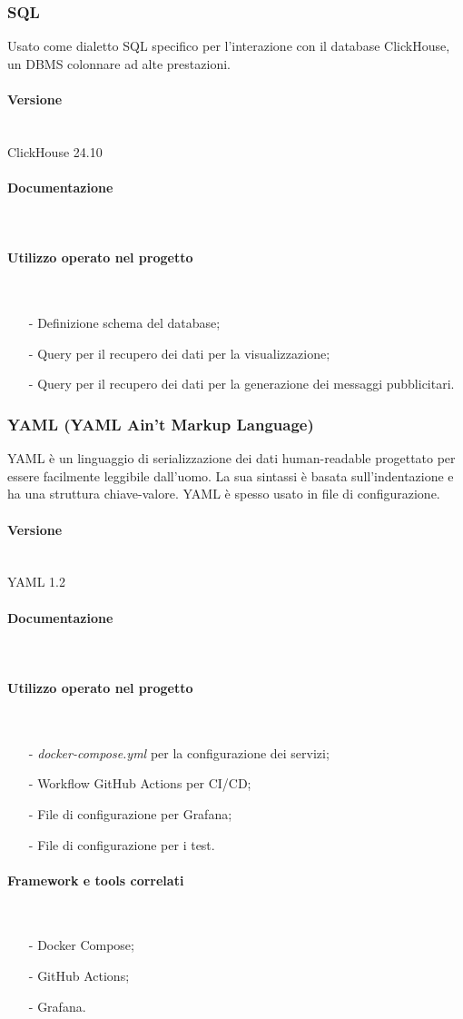 \documentclass[10pt]{article}
\newcommand{\myparagraph}[1]{\paragraph{#1}\mbox{}\\\vspace{0.4em}}
\begin{document}
\begin{justify}
        \subsubsection{SQL}
        Usato come dialetto SQL specifico per l'interazione con il database ClickHouse, un DBMS colonnare ad alte prestazioni.
            \myparagraph{Versione}
                ClickHouse 24.10
            \myparagraph{Documentazione}
            \myparagraph{Utilizzo operato nel progetto}
                \begin{itemize}
                    \item[-] Definizione schema del database;
                    \item[-] Query per il recupero dei dati per la visualizzazione;
                    \item[-] Query per il recupero dei dati per la generazione dei messaggi pubblicitari.
                \end{itemize}

        \subsubsection{YAML (YAML Ain't Markup Language)}
        YAML è un linguaggio di serializzazione dei dati human-readable progettato per essere facilmente leggibile dall'uomo. La sua 
        sintassi è basata sull'indentazione e ha una struttura chiave-valore. YAML è spesso usato in file di configurazione.
            \myparagraph{Versione} 
                YAML 1.2
            \myparagraph{Documentazione}
            \myparagraph{Utilizzo operato nel progetto}
                \begin{itemize}
                    \item[-] \textit{docker-compose.yml} per la configurazione dei servizi;
                    \item[-] Workflow GitHub Actions per CI/CD;
                    \item[-] File di configurazione per Grafana;
                    \item[-] File di configurazione per i test.
                \end{itemize}
            \myparagraph{Framework e tools correlati}
                \begin{itemize}
                    \item[-] Docker Compose;
                    \item[-] GitHub Actions;
                    \item[-] Grafana.
                \end{itemize}


\end{justify}
\end{document}
